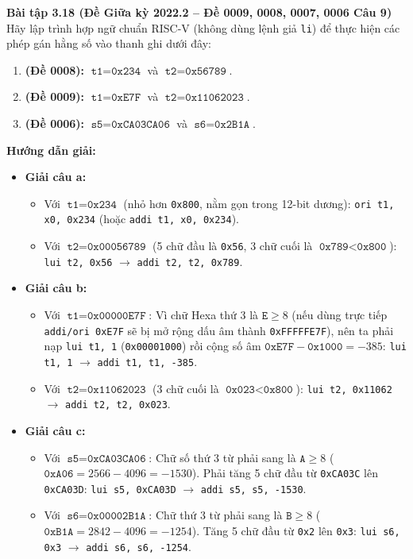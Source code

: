 \textbf{Bài tập 3.18 (Đề Giữa kỳ 2022.2 -- Đề 0009, 0008, 0007, 0006 Câu 9)}\\
Hãy lập trình hợp ngữ chuẩn RISC-V (không dùng lệnh giả \texttt{li}) để thực hiện các phép gán hằng số vào thanh ghi dưới đây:
\begin{enumerate}[label=\alph*)]
    \item \textbf{(Đề 0008):} $\texttt{t1} = \texttt{0x234}$ và $\texttt{t2} = \texttt{0x56789}$.
    \item \textbf{(Đề 0009):} $\texttt{t1} = \texttt{0xE7F}$ và $\texttt{t2} = \texttt{0x11062023}$.
    \item \textbf{(Đề 0006):} $\texttt{s5} = \texttt{0xCA03CA06}$ và $\texttt{s6} = \texttt{0x2B1A}$.
\end{enumerate}
\textbf{Hướng dẫn giải:}
\begin{itemize}
    \item \textbf{Giải câu a:}
    \begin{itemize}
        \item Với $\texttt{t1} = \texttt{0x234}$ (nhỏ hơn \texttt{0x800}, nằm gọn trong 12-bit dương): \texttt{ori t1, x0, 0x234} (hoặc \texttt{addi t1, x0, 0x234}).
        \item Với $\texttt{t2} = \texttt{0x00056789}$ (5 chữ đầu là \texttt{0x56}, 3 chữ cuối là $\texttt{0x789} < \texttt{0x800}$):
        \texttt{lui t2, 0x56} $\rightarrow$ \texttt{addi t2, t2, 0x789}.
    \end{itemize}
    \item \textbf{Giải câu b:}
    \begin{itemize}
        \item Với $\texttt{t1} = \texttt{0x00000E7F}$: Vì chữ Hexa thứ 3 là $\texttt{E} \ge 8$ (nếu dùng trực tiếp \texttt{addi/ori 0xE7F} sẽ bị mở rộng dấu âm thành \texttt{0xFFFFFE7F}), nên ta phải nạp \texttt{lui t1, 1} (\texttt{0x00001000}) rồi cộng số âm $\texttt{0xE7F} - \texttt{0x1000} = -385$: \texttt{lui t1, 1} $\rightarrow$ \texttt{addi t1, t1, -385}.
        \item Với $\texttt{t2} = \texttt{0x11062023}$ (3 chữ cuối là $\texttt{0x023} < \texttt{0x800}$):
        \texttt{lui t2, 0x11062} $\rightarrow$ \texttt{addi t2, t2, 0x023}.
    \end{itemize}
    \item \textbf{Giải câu c:}
    \begin{itemize}
        \item Với $\texttt{s5} = \texttt{0xCA03CA06}$: Chữ số thứ 3 từ phải sang là $\texttt{A} \ge 8$ ($\texttt{0xA06} = 2566 - 4096 = -1530$). Phải tăng 5 chữ đầu từ \texttt{0xCA03C} lên \texttt{0xCA03D}:
        \texttt{lui s5, 0xCA03D} $\rightarrow$ \texttt{addi s5, s5, -1530}.
        \item Với $\texttt{s6} = \texttt{0x00002B1A}$: Chữ thứ 3 từ phải sang là $\texttt{B} \ge 8$ ($\texttt{0xB1A} = 2842 - 4096 = -1254$). Tăng 5 chữ đầu từ \texttt{0x2} lên \texttt{0x3}:
        \texttt{lui s6, 0x3} $\rightarrow$ \texttt{addi s6, s6, -1254}.
    \end{itemize}
\end{itemize}

